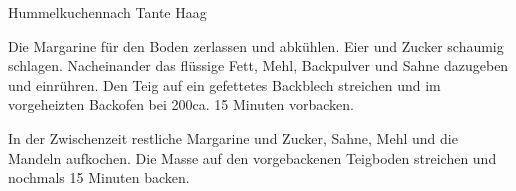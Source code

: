 \begin{recipe}{Hummelkuchen}{nach Tante Haag}\label{Hummelkuchen}


  \steps
  
  Die Margarine für den Boden zerlassen und abkühlen. Eier und Zucker
  schaumig schlagen. Nacheinander das flüssige Fett, Mehl, Backpulver und
  Sahne dazugeben und einrühren. Den Teig auf ein gefettetes Backblech
  streichen und im vorgeheizten Backofen bei 200\celsius ca. 15 Minuten
  vorbacken.
  
  In der Zwischenzeit restliche Margarine und Zucker, Sahne, Mehl und die
  Mandeln aufkochen. Die Masse auf den vorgebackenen Teigboden streichen und
  nochmals 15 Minuten backen.

\end{recipe}

